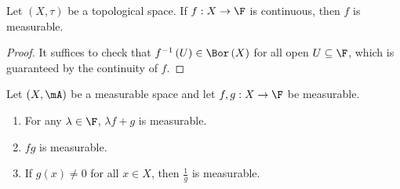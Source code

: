 \documentclass[pmath451]{subfiles}
\begin{document}
    \begin{prop}{}
        Let $\left( X,\tau \right)$ be a topological space. If $f:X\to\F$ is continuous, then $f$ is measurable.
    \end{prop}

    \begin{proof}
        It suffices to check that $f^{-1}\left( U \right)\in\Bor\left( X \right)$ for all open $U\subseteq\F$, which is guaranteed by the continuity of $f$.
    \end{proof}
    
    \begin{prop}{}
        Let $\left( X,\mA \right)$ be a measurable space and let $f,g:X\to\F$ be measurable.
        \begin{enumerate}
            \item For any $\lambda\in\F$, $\lambda f+g$ is measurable.
            \item $fg$ is measurable.
            \item If $g\left( x \right)\neq 0$ for all $x\in X$, then $\frac{1}{g}$ is measurable.
        \end{enumerate}
    \end{prop}
    
\end{document}
